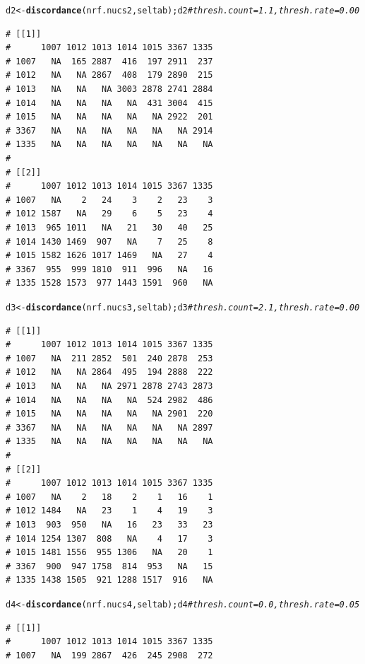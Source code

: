 \documentclass{article}\usepackage[]{graphicx}\usepackage[]{color}
\makeatletter
\newcommand{\hlcom}[1]{\textcolor[rgb]{0.678,0.584,0.686}{\textit{#1}}}%
\newcommand{\hlstd}[1]{\textcolor[rgb]{0.345,0.345,0.345}{#1}}%
\newcommand{\hlkwb}[1]{\textcolor[rgb]{0.69,0.353,0.396}{#1}}%
\newcommand{\hlkwd}[1]{\textcolor[rgb]{0.737,0.353,0.396}{\textbf{#1}}}%
\newenvironment{kframe}{%
 \def\at@end@of@kframe{}%
 \ifinner\ifhmode%
  \def\at@end@of@kframe{\end{minipage}}%
  \begin{minipage}{\columnwidth}%
 \fi\fi%
 \def\FrameCommand##1{\hskip\@totalleftmargin \hskip-\fboxsep
 \colorbox{shadecolor}{##1}\hskip-\fboxsep
     \hskip-\linewidth \hskip-\@totalleftmargin \hskip\columnwidth}%
 \MakeFramed {\advance\hsize-\width
   \@totalleftmargin\z@ \linewidth\hsize
   \@setminipage}}%
 {\par\unskip\endMakeFramed%
 \at@end@of@kframe}
\newenvironment{knitrout}{}{} %
\makeatother
\begin{document}
\begin{knitrout}\footnotesize
{}\color{fgcolor}\begin{kframe}
\begin{alltt}
\hlstd{d2} \hlkwb{<-} \hlkwd{discordance}\hlstd{(nrf.nucs2, seltab); d2} \hlcom{# thresh.count=1.1, thresh.rate=0.00}
\end{alltt}
\begin{verbatim}
# [[1]]
#      1007 1012 1013 1014 1015 3367 1335
# 1007   NA  165 2887  416  197 2911  237
# 1012   NA   NA 2867  408  179 2890  215
# 1013   NA   NA   NA 3003 2878 2741 2884
# 1014   NA   NA   NA   NA  431 3004  415
# 1015   NA   NA   NA   NA   NA 2922  201
# 3367   NA   NA   NA   NA   NA   NA 2914
# 1335   NA   NA   NA   NA   NA   NA   NA
# 
# [[2]]
#      1007 1012 1013 1014 1015 3367 1335
# 1007   NA    2   24    3    2   23    3
# 1012 1587   NA   29    6    5   23    4
# 1013  965 1011   NA   21   30   40   25
# 1014 1430 1469  907   NA    7   25    8
# 1015 1582 1626 1017 1469   NA   27    4
# 3367  955  999 1810  911  996   NA   16
# 1335 1528 1573  977 1443 1591  960   NA
\end{verbatim}
\begin{alltt}
\hlstd{d3} \hlkwb{<-} \hlkwd{discordance}\hlstd{(nrf.nucs3, seltab); d3} \hlcom{# thresh.count=2.1, thresh.rate=0.00}
\end{alltt}
\begin{verbatim}
# [[1]]
#      1007 1012 1013 1014 1015 3367 1335
# 1007   NA  211 2852  501  240 2878  253
# 1012   NA   NA 2864  495  194 2888  222
# 1013   NA   NA   NA 2971 2878 2743 2873
# 1014   NA   NA   NA   NA  524 2982  486
# 1015   NA   NA   NA   NA   NA 2901  220
# 3367   NA   NA   NA   NA   NA   NA 2897
# 1335   NA   NA   NA   NA   NA   NA   NA
# 
# [[2]]
#      1007 1012 1013 1014 1015 3367 1335
# 1007   NA    2   18    2    1   16    1
# 1012 1484   NA   23    1    4   19    3
# 1013  903  950   NA   16   23   33   23
# 1014 1254 1307  808   NA    4   17    3
# 1015 1481 1556  955 1306   NA   20    1
# 3367  900  947 1758  814  953   NA   15
# 1335 1438 1505  921 1288 1517  916   NA
\end{verbatim}
\begin{alltt}
\hlstd{d4} \hlkwb{<-} \hlkwd{discordance}\hlstd{(nrf.nucs4, seltab); d4} \hlcom{# thresh.count=0.0, thresh.rate=0.05}
\end{alltt}
\begin{verbatim}
# [[1]]
#      1007 1012 1013 1014 1015 3367 1335
# 1007   NA  199 2867  426  245 2908  272

\end{verbatim}
\end{kframe}
\end{knitrout}
\end{document}
